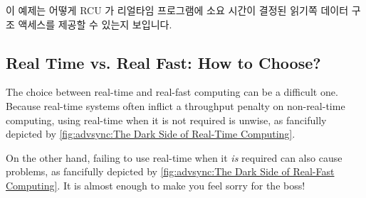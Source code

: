 이 예제는 어떻게 RCU 가 리얼타임 프로그램에 소요 시간이 결정된 읽기쪽 데이터
구조 액세스를 제공할 수 있는지 보입니다.

\subsection{Real Time vs. Real Fast: How to Choose?}
\label{sec:advsync:Real Time vs. Real Fast: How to Choose?}

The choice between real-time and real-fast computing can be a difficult one.
Because real-time systems often inflict a throughput penalty on
non-real-time computing, using real-time when it is not required is
unwise, as fancifully depicted by
\cref{fig:advsync:The Dark Side of Real-Time Computing}.


On the other hand, failing to use real-time when it \emph{is} required
can also cause problems, as fancifully depicted by
\cref{fig:advsync:The Dark Side of Real-Fast Computing}.
It is almost enough to make you feel sorry for the boss!


